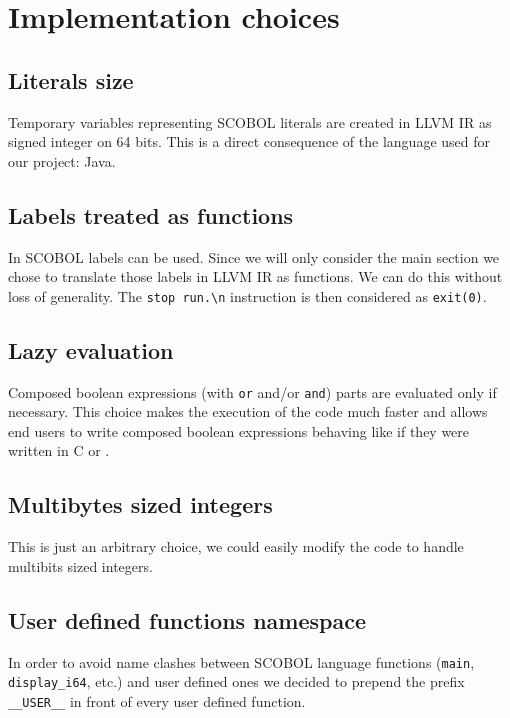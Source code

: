 \section{Implementation choices}

\subsection{Literals size}

Temporary variables representing SCOBOL literals are created in LLVM IR as signed integer on 64 bits. This is a direct consequence of the language used for our project: Java.


\subsection{Labels treated as functions}

In SCOBOL labels can be used. Since we will only consider the main section we chose to translate those labels in LLVM IR as functions. We can do this without loss of generality. The \verb!stop run.\n! instruction is then considered as \verb!exit(0)!.

\subsection{Lazy evaluation}

Composed boolean expressions (with \verb!or! and/or \verb!and!) parts are evaluated only if necessary. This choice makes the execution of the code much faster and allows end users to write composed boolean expressions behaving like if they were written in C or \CXX.

\subsection{Multibytes sized integers}

This is just an arbitrary choice, we could easily modify the code to handle multibits sized integers.

\subsection{User defined functions namespace}

In order to avoid name clashes between SCOBOL language functions (\verb!main!, \verb!display_i64!, etc.) and user defined ones we decided to prepend the prefix \verb!__USER__! in front of every user defined function.

